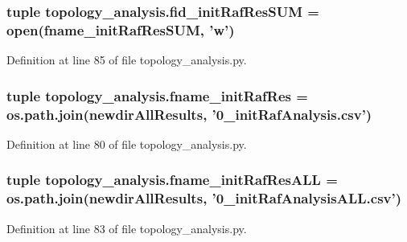 \hypertarget{a00157_a89401fb2ff1eb8e1567b1625ad0bb84f}{
\subsubsection[{fid\-\_\-init\-Raf\-Res\-S\-U\-M}]{\setlength{\rightskip}{0pt plus 5cm}tuple topology\-\_\-analysis.\-fid\-\_\-init\-Raf\-Res\-S\-U\-M = open({\bf fname\-\_\-init\-Raf\-Res\-S\-U\-M}, 'w')}}\label{a00157_a89401fb2ff1eb8e1567b1625ad0bb84f}


Definition at line 85 of file topology\-\_\-analysis.\-py.

\hypertarget{a00157_a80488e9379ed7dc114c3ea6739d4fda9}{
\subsubsection[{fname\-\_\-init\-Raf\-Res}]{\setlength{\rightskip}{0pt plus 5cm}tuple topology\-\_\-analysis.\-fname\-\_\-init\-Raf\-Res = os.\-path.\-join({\bf newdir\-All\-Results}, '0\-\_\-init\-Raf\-Analysis.\-csv')}}\label{a00157_a80488e9379ed7dc114c3ea6739d4fda9}


Definition at line 80 of file topology\-\_\-analysis.\-py.

\hypertarget{a00157_a2ef3a802ca870bda339c2b50c046bc71}{
\subsubsection[{fname\-\_\-init\-Raf\-Res\-A\-L\-L}]{\setlength{\rightskip}{0pt plus 5cm}tuple topology\-\_\-analysis.\-fname\-\_\-init\-Raf\-Res\-A\-L\-L = os.\-path.\-join({\bf newdir\-All\-Results}, '0\-\_\-init\-Raf\-Analysis\-A\-L\-L.\-csv')}}\label{a00157_a2ef3a802ca870bda339c2b50c046bc71}


Definition at line 83 of file topology\-\_\-analysis.\-py.

